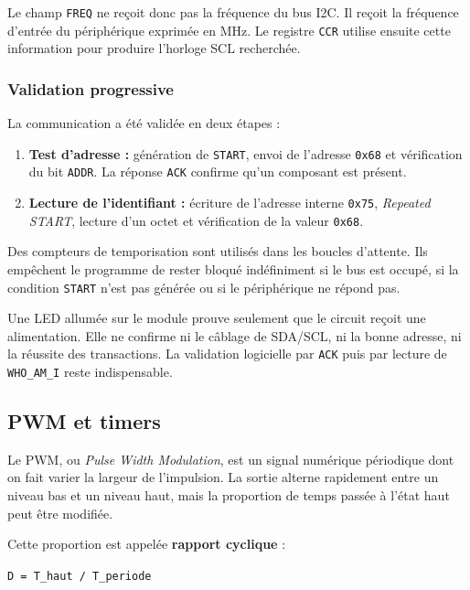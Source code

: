 \documentclass[11pt,a4paper]{article}
\begin{document}
	Le champ \texttt{FREQ} ne reçoit donc pas la fréquence du bus I2C. Il reçoit la fréquence d'entrée du périphérique exprimée en MHz. Le registre \texttt{CCR} utilise ensuite cette information pour produire l'horloge SCL recherchée.
	
	\subsubsection*{Validation progressive}
	
	La communication a été validée en deux étapes :
	
	\begin{enumerate}
		\item \textbf{Test d'adresse :} génération de \texttt{START}, envoi de l'adresse \texttt{0x68} et vérification du bit \texttt{ADDR}. La réponse \texttt{ACK} confirme qu'un composant est présent.
		\item \textbf{Lecture de l'identifiant :} écriture de l'adresse interne \texttt{0x75}, \textit{Repeated START}, lecture d'un octet et vérification de la valeur \texttt{0x68}.
	\end{enumerate}
	
	Des compteurs de temporisation sont utilisés dans les boucles d'attente. Ils empêchent le programme de rester bloqué indéfiniment si le bus est occupé, si la condition \texttt{START} n'est pas générée ou si le périphérique ne répond pas.
	
	\begin{warningbox}
		Une LED allumée sur le module prouve seulement que le circuit reçoit une alimentation. Elle ne confirme ni le câblage de SDA/SCL, ni la bonne adresse, ni la réussite des transactions. La validation logicielle par \texttt{ACK} puis par lecture de \texttt{WHO\_AM\_I} reste indispensable.
	\end{warningbox}
	
	\subsection*{PWM et timers}
	
	Le PWM, ou \textit{Pulse Width Modulation}, est un signal numérique périodique dont on fait varier la largeur de l'impulsion. La sortie alterne rapidement entre un niveau bas et un niveau haut, mais la proportion de temps passée à l'état haut peut être modifiée.
	
	Cette proportion est appelée \textbf{rapport cyclique} :
	
	\begin{center}
		\texttt{D = T\_haut / T\_periode}
	\end{center}
	
\end{document}
